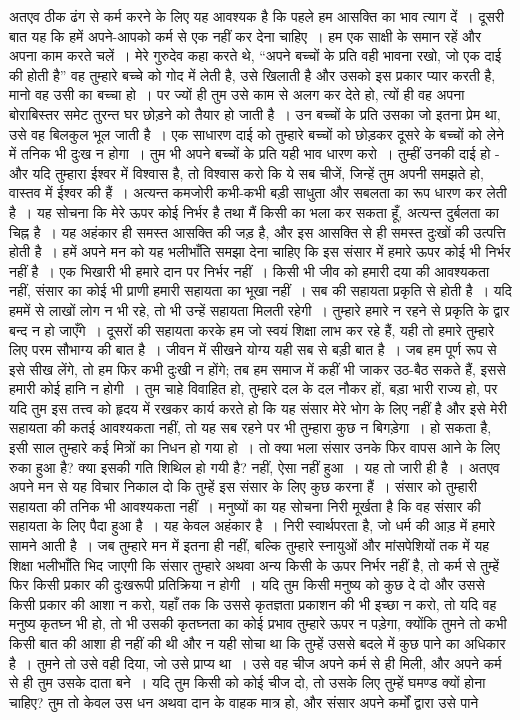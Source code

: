 अतएव ठीक ढंग से कर्म करने के लिए यह आवश्यक है कि पहले हम आसक्ति का भाव त्याग दें~। दूसरी बात यह कि हमें अपने-आपको कर्म से एक नहीं कर देना चाहिए~। हम एक साक्षी के समान रहें और अपना काम करते चलें~। मेरे गुरुदेव कहा करते थे, “अपने बच्चों के प्रति वही भावना रखो, जो एक दाई की होती है” वह तुम्हारे बच्चे को गोद में लेती है, उसे खिलाती है और उसको इस प्रकार प्यार करती है, मानो वह उसी का बच्चा हो~। पर ज्यों ही तुम उसे काम से अलग कर देते हो, त्यों ही वह अपना बोराबिस्तर समेट तुरन्त घर छोड़ने को तैयार हो जाती है~। उन बच्चों के प्रति उसका जो इतना प्रेम था, उसे वह बिलकुल भूल जाती है~। एक साधारण दाई को तुम्हारे बच्चों को छोड़कर दूसरे के बच्चों को लेने में तनिक भी दुःख न होगा~। तुम भी अपने बच्चों के प्रति यही भाव धारण करो~। तुम्हीं उनकी दाई हो - और यदि तुम्हारा ईश्वर में विश्वास है, तो विश्वास करो कि ये सब चीजें, जिन्हें तुम अपनी समझते हो, वास्तव में ईश्वर की हैं~। अत्यन्त कमजोरी कभी-कभी बड़ी साधुता और सबलता का रूप धारण कर लेती है~। यह सोचना कि मेरे ऊपर कोई निर्भर है तथा मैं किसी का भला कर सकता हूँ, अत्यन्त दुर्बलता का चिह्न है~। यह अहंकार ही समस्त आसक्ति की जड़ है, और इस आसक्ति से ही समस्त दुःखों की उत्पत्ति होती है~। हमें अपने मन को यह भलीभाँति समझा देना चाहिए कि इस संसार में हमारे ऊपर कोई भी निर्भर नहीं है~। एक भिखारी भी हमारे दान पर निर्भर नहीं~। किसी भी जीव को हमारी दया की आवश्यकता नहीं, संसार का कोई भी प्राणी हमारी सहायता का भूखा नहीं~। सब की सहायता प्रकृति से होती है~। यदि हममें से लाखों लोग न भी रहे, तो भी उन्हें सहायता मिलती रहेगी~। तुम्हारे हमारे न रहने से प्रकृति के द्वार बन्द न हो जाएँगे~। दूसरों की सहायता करके हम जो स्वयं शिक्षा लाभ कर रहे हैं, यही तो हमारे तुम्हारे लिए परम सौभाग्य की बात है~। जीवन में सीखने योग्य यही सब से बड़ी बात है~। जब हम पूर्ण रूप से इसे सीख लेंगे, तो हम फिर कभी दुःखी न होंगे; तब हम समाज में कहीं भी जाकर उठ-बैठ सकते हैं, इससे हमारी कोई हानि न होगी~। तुम चाहे विवाहित हो, तुम्हारे दल के दल नौकर हों, बड़ा भारी राज्य हो, पर यदि तुम इस तत्त्व को हृदय में रखकर कार्य करते हो कि यह संसार मेरे भोग के लिए नहीं है और इसे मेरी सहायता की कतई आवश्यकता नहीं, तो यह सब रहने पर भी तुम्हारा कुछ न बिगड़ेगा~। हो सकता है, इसी साल तुम्हारे कई मित्रों का निधन हो गया हो~। तो क्या भला संसार उनके फिर वापस आने के लिए रुका हुआ है? क्या इसकी गति शिथिल हो गयी है? नहीं, ऐसा नहीं हुआ~। यह तो जारी ही है~। अतएव अपने मन से यह विचार निकाल दो कि तुम्हें इस संसार के लिए कुछ करना हैं~। संसार को तुम्हारी सहायता की तनिक भी आवश्यकता नहीं~। मनुष्यों का यह सोचना निरी मूर्खता है कि वह संसार की सहायता के लिए पैदा हुआ है~। यह केवल अहंकार है~। निरी स्वार्थपरता है, जो धर्म की आड़ में हमारे सामने आती है~। जब तुम्हारे मन में इतना ही नहीं, बल्कि तुम्हारे स्नायुओं और मांसपेशियों तक में यह शिक्षा भलीभाँति भिद जाएगी कि संसार तुम्हारे अथवा अन्य किसी के ऊपर निर्भर नहीं है, तो कर्म से तुम्हें फिर किसी प्रकार की दुःखरूपी प्रतिक्रिया न होगी~। यदि तुम किसी मनुष्य को कुछ दे दो और उससे किसी प्रकार की आशा न करो, यहाँ तक कि उससे कृतज्ञता प्रकाशन की भी इच्छा न करो, तो यदि वह मनुष्य कृतघ्न भी हो, तो भी उसकी कृतघ्नता का कोई प्रभाव तुम्हारे ऊपर न पड़ेगा, क्योंकि तुमने तो कभी किसी बात की आशा ही नहीं की थी और न यही सोचा था कि तुम्हें उससे बदले में कुछ पाने का अधिकार है~। तुमने तो उसे वही दिया, जो उसे प्राप्य था~। उसे वह चीज अपने कर्म से ही मिली, और अपने कर्म से ही तुम उसके दाता बने~। यदि तुम किसी को कोई चीज दो, तो उसके लिए तुम्हें घमण्ड क्यों होना चाहिए? तुम तो केवल उस धन अथवा दान के वाहक मात्र हो, और संसार अपने कर्मों द्वारा उसे पाने 